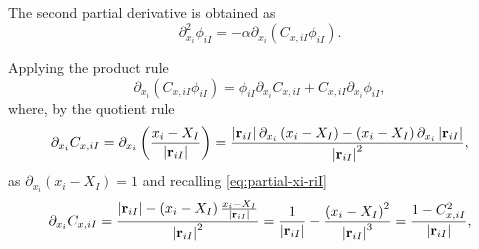 The second partial derivative is obtained as
\begin{equation} \label{eq:der2-xi-phi-1}
    \partial_{x_{i}}^{2} \phi_{iI}
    =
    -\alpha
    \partial_{x_{i}}
    \left( 
        C_{x,iI}
        \phi_{iI} 
    \right)
    .
\end{equation}

Applying the product rule
\begin{equation} \label{eq:der2-xi-phi-2}
    \partial_{x_i}
    \left( 
        C_{x,iI}
        \phi_{iI} 
    \right)
    =
    \phi_{iI}
    \partial_{x_i}
    C_{x,iI}
    +
    C_{x,iI}
    \partial_{x_i}
    \phi_{iI}
    ,
\end{equation}
where, by the quotient rule
\begin{equation}
    \partial_{x_i}
    C_{x,iI}
    =
    \partial_{x_i}
    \left( 
        \frac{x_i - X_I}{\left| \boldsymbol{\mathrm{r}}_{iI} \right|}
    \right)
    =
    \frac{
        \left| \boldsymbol{\mathrm{r}}_{iI} \right|
        \partial_{x_i}
        \left( x_i - X_I \right)
        -
        \left( x_i - X_I \right)
        \partial_{x_i}
        \left| \boldsymbol{\mathrm{r}}_{iI} \right|
    }{
        \left| \boldsymbol{\mathrm{r}}_{iI} \right|^{2}
    }
    ,
\end{equation}
as $\partial_{x_i} \left( x_i - X_I \right) = 1$ and recalling \cref{eq:partial-xi-riI}
\begin{equation}
    \partial_{x_i}
    C_{x,iI}
    =
    \frac{
        \left| \boldsymbol{\mathrm{r}}_{iI} \right|
        -
        \left( x_i - X_I \right)
        \frac{x_i - X_I}{\left| \boldsymbol{\mathrm{r}}_{iI} \right|}
    }{
        \left| \boldsymbol{\mathrm{r}}_{iI} \right|^{2}
    }
    =
    \frac{
        1
    }{
        \left| \boldsymbol{\mathrm{r}}_{iI} \right|
    }
    -
    \frac{
        \left( x_i - X_I \right)^{2}
    }{
        \left| \boldsymbol{\mathrm{r}}_{iI} \right|^{3}
    }
    =
    \frac{
        1 - C_{x,iI}^{2}
    }{
        \left| \boldsymbol{\mathrm{r}}_{iI} \right|
    }
    ,
\end{equation}

